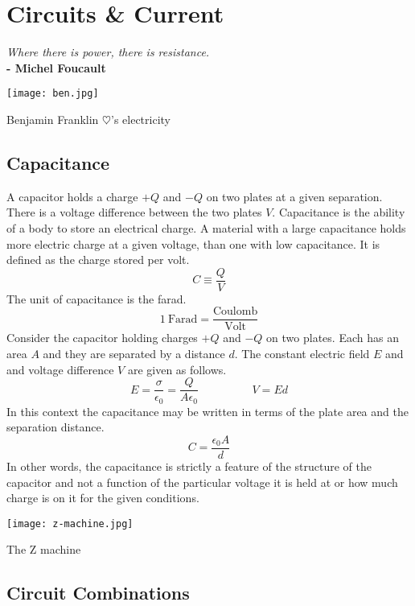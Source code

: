 \chapter{Circuits \& Current}

\textit{Where there is power, there is resistance.}\\
\noindent\textbf{-   Michel Foucault}

\vspace{1cm}

\begin{marginfigure}%
  \texttt{[image: ben.jpg]}
  \caption{Benjamin Franklin $\heartsuit$'s electricity}
  \label{fig:marginfig}
\end{marginfigure}

\section{Capacitance}
A capacitor holds a charge $+Q$ and $-Q$ on two plates at a given separation.   There is a voltage difference between the two plates $V$.
Capacitance is the ability of a body to store an electrical charge. A material with a large capacitance holds more electric charge at a given voltage, than one with low capacitance.  It is defined as the charge stored per volt.
$$C\equiv\frac{Q}{V}$$
The unit of capacitance is the farad.
$$1\ \text{Farad}=\frac{\text{Coulomb}}{\text{Volt}}$$
Consider the capacitor holding charges $+Q$ and $-Q$ on two plates.  Each has an area $A$ and they are separated by a distance $d$.  The constant electric field $E$ and and voltage difference $V$ are given as follows. 
$$E=\frac{\sigma}{\epsilon_0}=\frac{Q}{A\epsilon_0} \hspace{2cm} V=Ed$$
In this context the capacitance may be written in terms of the plate area and the separation distance.  
$$C=\frac{\epsilon_0A}{d}$$
In other words, the capacitance is strictly a feature of the structure of the capacitor and not a function of the particular voltage it is held at or how much charge is on it for the given conditions.

\newpage
\begin{marginfigure}%
  \texttt{[image: z-machine.jpg]}
  \caption{The Z machine}
  \label{fig:marginfig}
\end{marginfigure}

\section{Circuit Combinations}
